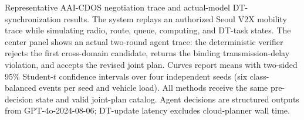 \caption{Representative AAI-CDOS negotiation trace and actual-model DT-synchronization results. The system replays an authorized Seoul V2X mobility trace while simulating radio, route, queue, computing, and DT-task states. The center panel shows an actual two-round agent trace: the deterministic verifier rejects the first cross-domain candidate, returns the binding transmission-delay violation, and accepts the revised joint plan. Curves report means with two-sided 95\% Student-$t$ confidence intervals over four independent seeds (six class-balanced events per seed and vehicle load). All methods receive the same pre-decision state and valid joint-plan catalog. Agent decisions are structured outputs from GPT-4o-2024-08-06; DT-update latency excludes cloud-planner wall time.}
